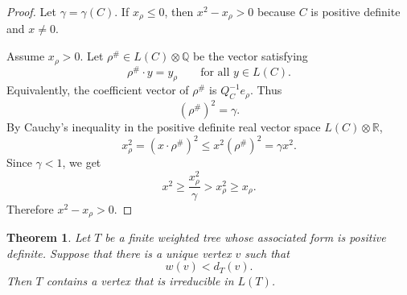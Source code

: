 \documentclass[12pt]{article}
\newtheorem{theorem}{Theorem}
\begin{document}
\begin{proof}
Let \(\gamma=\gamma(C)\). If \(x_\rho\le 0\), then \(x^2-x_\rho>0\) because \(C\) is positive definite and \(x\ne 0\).

Assume \(x_\rho>0\). Let \(\rho^\#\in L(C)\otimes \mathbb Q\) be the vector satisfying
\[
\rho^\#\cdot y=y_\rho
\qquad
\text{for all } y\in L(C).
\]
Equivalently, the coefficient vector of \(\rho^\#\) is \(Q_C^{-1}e_\rho\). Thus
\[
(\rho^\#)^2=\gamma.
\]
By Cauchy's inequality in the positive definite real vector space \(L(C)\otimes\mathbb R\),
\[
x_\rho^2=(x\cdot \rho^\#)^2\le x^2(\rho^\#)^2=\gamma x^2.
\]
Since \(\gamma<1\), we get
\[
x^2\ge \frac{x_\rho^2}{\gamma}>x_\rho^2\ge x_\rho.
\]
Therefore \(x^2-x_\rho>0\).
\end{proof}

\begin{theorem}
Let \(T\) be a finite weighted tree whose associated form is positive definite. Suppose that there is a unique vertex \(v\) such that
\[
w(v)<d_T(v).
\]
Then \(T\) contains a vertex that is irreducible in \(L(T)\).
\end{theorem}
\end{document}
